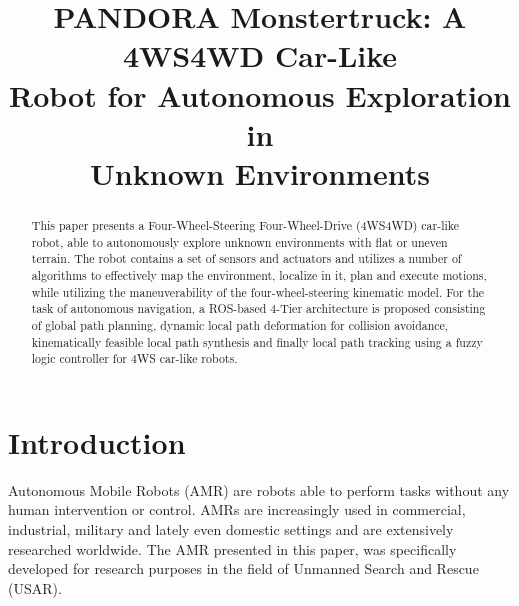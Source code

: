 \documentclass[conference]{IEEEtran}
\begin{document}
\title{PANDORA Monstertruck: A 4WS4WD Car-Like\\Robot for Autonomous Exploration in\\Unknown Environments}


\author{
\and
{}
}

\maketitle

\begin{abstract}
This paper presents a Four-Wheel-Steering Four-Wheel-Drive (4WS4WD) car-like robot, able to autonomously explore unknown environments with flat or uneven terrain. The robot contains a set of sensors and actuators and utilizes a number of algorithms to effectively map the environment, localize in it, plan and execute motions, while utilizing the maneuverability of the four-wheel-steering kinematic model. For the task of autonomous navigation, a ROS-based 4-Tier architecture is proposed consisting of global path planning, dynamic local path deformation for collision avoidance, kinematically feasible local path synthesis and finally local path tracking using a fuzzy logic controller for 4WS car-like robots.
\end{abstract}


\section{Introduction} \label{sec:introduction}
Autonomous Mobile Robots (AMR) are robots able to perform tasks without any human intervention or control. AMRs are increasingly used in commercial, industrial, military and lately even domestic settings and are extensively researched worldwide. The AMR presented in this paper, was specifically developed for research purposes in the field of Unmanned Search and Rescue (USAR).
\end{document}

